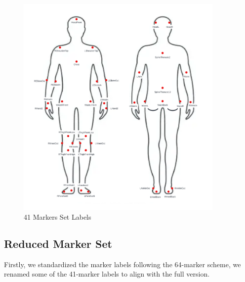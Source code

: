 \begin{figure}[H]
    \centering
    \includegraphics[width=0.9\textwidth]{graphics/41Markers.png}
    \caption{41 Markers Set Labels}
    \label{fig:41markers}
\end{figure}



\subsection{Reduced Marker Set}
Firstly, we standardized the marker labels following the 64-marker scheme, 
we renamed some of the 41-marker labels to align with the full version.

